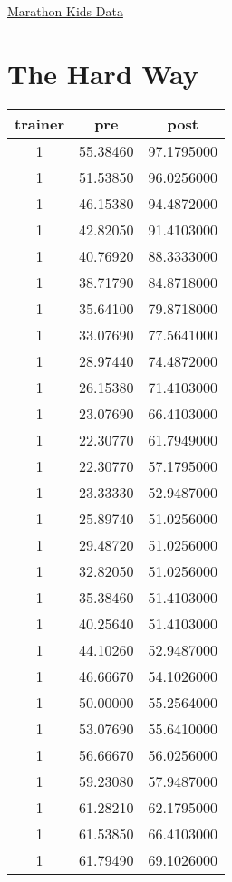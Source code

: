 \documentclass[
]{book}
\begin{document}
\href{https://github.com/docs4class/marathon_kids_data}{Marathon Kids Data}

\hypertarget{the-hard-way}{%
\section{The Hard Way}\label{the-hard-way}}

\begin{tabular}{c|c|c}
\hline
trainer & pre & post\\
\hline
1 & 55.38460 & 97.1795000\\
\hline
1 & 51.53850 & 96.0256000\\
\hline
1 & 46.15380 & 94.4872000\\
\hline
1 & 42.82050 & 91.4103000\\
\hline
1 & 40.76920 & 88.3333000\\
\hline
1 & 38.71790 & 84.8718000\\
\hline
1 & 35.64100 & 79.8718000\\
\hline
1 & 33.07690 & 77.5641000\\
\hline
1 & 28.97440 & 74.4872000\\
\hline
1 & 26.15380 & 71.4103000\\
\hline
1 & 23.07690 & 66.4103000\\
\hline
1 & 22.30770 & 61.7949000\\
\hline
1 & 22.30770 & 57.1795000\\
\hline
1 & 23.33330 & 52.9487000\\
\hline
1 & 25.89740 & 51.0256000\\
\hline
1 & 29.48720 & 51.0256000\\
\hline
1 & 32.82050 & 51.0256000\\
\hline
1 & 35.38460 & 51.4103000\\
\hline
1 & 40.25640 & 51.4103000\\
\hline
1 & 44.10260 & 52.9487000\\
\hline
1 & 46.66670 & 54.1026000\\
\hline
1 & 50.00000 & 55.2564000\\
\hline
1 & 53.07690 & 55.6410000\\
\hline
1 & 56.66670 & 56.0256000\\
\hline
1 & 59.23080 & 57.9487000\\
\hline
1 & 61.28210 & 62.1795000\\
\hline
1 & 61.53850 & 66.4103000\\
\hline
1 & 61.79490 & 69.1026000\\

\end{tabular}
\end{document}
